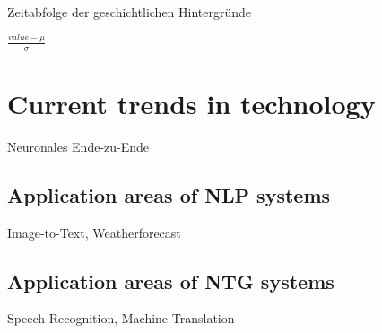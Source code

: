Zeitabfolge der geschichtlichen Hintergründe

\(\frac{value - \mu}{\sigma}\)

\section{Current trends in technology}\label{ss:trends}

Neuronales Ende-zu-Ende

\subsection{Application areas of NLP systems}
Image-to-Text, Weatherforecast

\subsection{Application areas of NTG systems}
Speech Recognition, Machine Translation